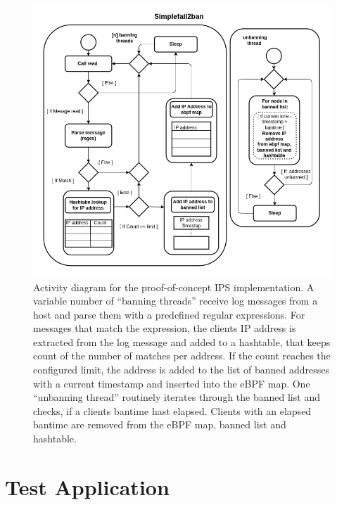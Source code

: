 \begin{figure}[p]
    \includegraphics[width=\textwidth]{images/ips_architecture.png}
    \caption[Simplefail2ban Architecture]{Activity diagram for the proof-of-concept IPS implementation. A variable number of ``banning threads'' receive log messages from a host and
    parse them with a predefined regular expressions. For messages that match the expression, the clients IP address is extracted from the log message and added to a hashtable, that keeps count of
    the number of matches per address. If the count reaches the configured limit, the address is added to the list of banned addresses with a current timestamp and inserted into the eBPF map. One ``unbanning
   thread'' routinely iterates through the banned list and checks, if a clients bantime hast elapsed. Clients with an elapsed bantime are removed from the eBPF map, banned list and hashtable.}
   \label{fig:meta_architecture}
\end{figure}

\section{Test Application}


